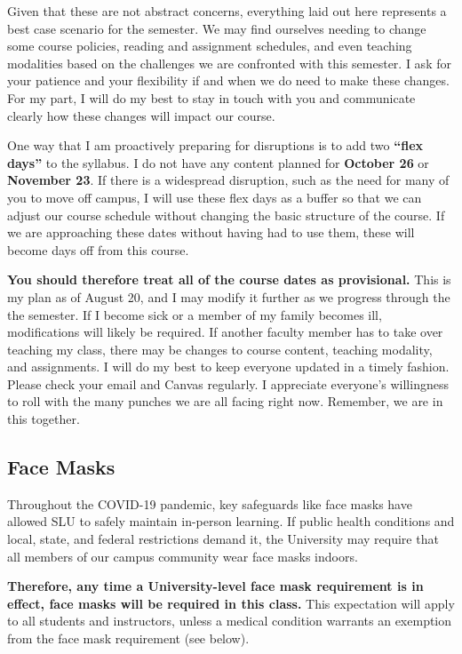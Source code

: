 \documentclass[
]{book}
\begin{document}
Given that these are not abstract concerns, everything laid out here represents a best case scenario for the semester. We may find ourselves needing to change some course policies, reading and assignment schedules, and even teaching modalities based on the challenges we are confronted with this semester. I ask for your patience and your flexibility if and when we do need to make these changes. For my part, I will do my best to stay in touch with you and communicate clearly how these changes will impact our course.

One way that I am proactively preparing for disruptions is to add two \textbf{``flex days''} to the syllabus. I do not have any content planned for \textbf{October 26} or \textbf{November 23}. If there is a widespread disruption, such as the need for many of you to move off campus, I will use these flex days as a buffer so that we can adjust our course schedule without changing the basic structure of the course. If we are approaching these dates without having had to use them, these will become days off from this course.

\textbf{You should therefore treat all of the course dates as provisional.} This is my plan as of August 20, and I may modify it further as we progress through the the semester. If I become sick or a member of my family becomes ill, modifications will likely be required. If another faculty member has to take over teaching my class, there may be changes to course content, teaching modality, and assignments. I will do my best to keep everyone updated in a timely fashion. Please check your email and Canvas regularly. I appreciate everyone's willingness to roll with the many punches we are all facing right now. Remember, we are in this together.

\hypertarget{face-masks}{%
\subsection{Face Masks}\label{face-masks}}

Throughout the COVID-19 pandemic, key safeguards like face masks have allowed SLU to safely maintain in-person learning. If public health conditions and local, state, and federal restrictions demand it, the University may require that all members of our campus community wear face masks indoors.

\textbf{Therefore, any time a University-level face mask requirement is in effect, face masks will be required in this class.} This expectation will apply to all students and instructors, unless a medical condition warrants an exemption from the face mask requirement (see below).
\end{document}
